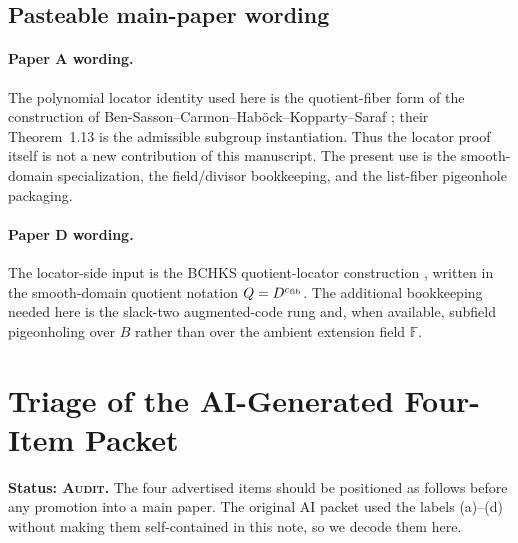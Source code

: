 \documentclass[11pt]{article}
\newcommand{\F}{\mathbb F}
\newcommand{\efib}{c_{\rm fib}}
\begin{document}
\subsection{Pasteable main-paper wording}

\paragraph{Paper A wording.}
The polynomial locator identity used here is the quotient-fiber form of the
construction of Ben-Sasson--Carmon--Hab\"ock--Kopparty--Saraf
\cite[Thm.~7.1]{BCHKS25}; their Theorem~1.13 is the admissible subgroup
instantiation.  Thus the locator proof itself is not a new contribution of
this manuscript.  The present use is the smooth-domain specialization, the
field/divisor bookkeeping, and the list-fiber pigeonhole packaging.

\paragraph{Paper D wording.}
The locator-side input is the BCHKS quotient-locator construction
\cite[Thm.~7.1; cf.~Thm.~1.13]{BCHKS25}, written in the smooth-domain quotient
notation \(Q=D^{\efib}\).  The additional bookkeeping needed here is the
slack-two augmented-code rung and, when available, subfield pigeonholing over
\(B\) rather than over the ambient extension field \(\F\).

\section{Triage of the AI-Generated Four-Item Packet}
\label{sec:packet-triage}

\textbf{Status: \textsc{Audit}.}
The four advertised items should be positioned as follows before any promotion
into a main paper.  The original AI packet used the labels (a)--(d) without
making them self-contained in this note, so we decode them here.
\end{document}
